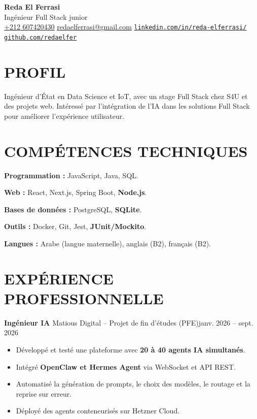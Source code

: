 \documentclass[11pt,a4paper]{article}
\newcommand{\entry}[2]{\noindent #1\hfill #2\par}
\begin{document}
\begin{center}
  {\LARGE\bfseries Reda El Ferrasi}\\[3pt]
  {\large Ingénieur Full Stack junior}\\[5pt]
  {\small
    \href{tel:+212607420430}{+212 607420430}
    \enspace\textbar{}\enspace
    \href{mailto:redaelferrasi@gmail.com}{redaelferrasi@gmail.com}
    \enspace\textbar{}\enspace
    \href{https://www.linkedin.com/in/reda-elferrasi/}{\nolinkurl{linkedin.com/in/reda-elferrasi/}}
    \enspace\textbar{}\enspace
    \href{https://github.com/redaelfer}{\nolinkurl{github.com/redaelfer}}
  }
\end{center}
\vspace{-5pt}


\section*{PROFIL}
Ingénieur d’État en Data Science et IoT, avec un stage Full Stack chez S4U et des projets web. Intéressé par l’intégration de l’IA dans les solutions Full Stack pour améliorer l’expérience utilisateur.

\section*{COMPÉTENCES TECHNIQUES}
\textbf{Programmation :} JavaScript, Java, SQL.\par
\textbf{Web :} React, Next.js, Spring Boot, \textbf{Node.js}.\par
\textbf{Bases de données :} PostgreSQL, \textbf{SQLite}.\par
\textbf{Outils :} Docker, Git, Jest, \textbf{JUnit/Mockito}.\par
\textbf{Langues :} Arabe (langue maternelle), anglais (B2), français (B2).

\section*{EXPÉRIENCE PROFESSIONNELLE}

\entry{\textbf{Ingénieur IA} \textbar{} Matious Digital -- Projet de fin d'études (PFE)}{janv. 2026 -- sept. 2026}
\begin{itemize}
  \item Développé et testé une plateforme avec \textbf{20 à 40 agents IA simultanés}.
  \item Intégré \textbf{OpenClaw et Hermes Agent} via WebSocket et API REST.
  \item Automatisé la génération de prompts, le choix des modèles, le routage et la reprise sur erreur.
  \item Déployé des agents conteneurisés sur Hetzner Cloud.
\end{itemize}
\end{document}
